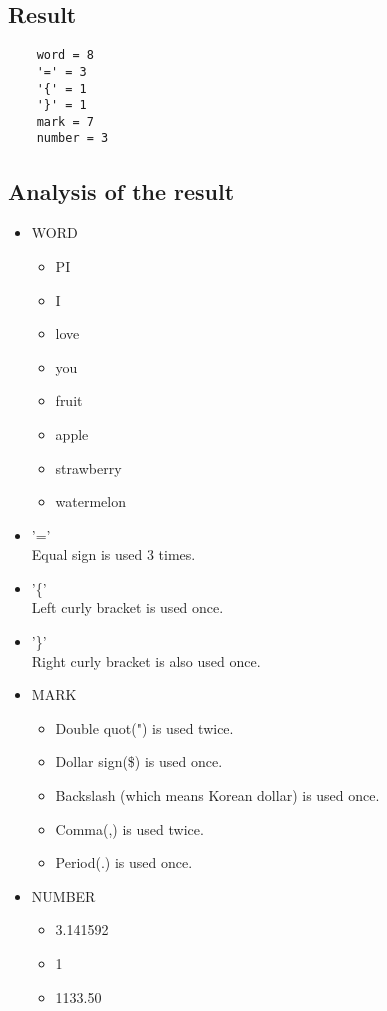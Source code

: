 \documentclass{article}
\begin{document}
\subsection{Result}
\begin{lstlisting}
    word = 8
    '=' = 3
    '{' = 1
    '}' = 1
    mark = 7
    number = 3
\end{lstlisting}

\subsection{Analysis of the result}
\begin{itemize}
    \item WORD
        \begin{itemize}
            \item PI
            \item I
            \item love
            \item you
            \item fruit
            \item apple
            \item strawberry
            \item watermelon
        \end{itemize}
    \item '=' \\
    Equal sign is used 3 times.
    \item '\{' \\
    Left curly bracket is used once.
    \item '\}' \\
    Right curly bracket is also used once.
    \item MARK
        \begin{itemize}
            \item Double quot(") is used twice.
            \item Dollar sign(\$) is used once.
            \item Backslash (which means Korean dollar) is used once.
            \item Comma(,) is used twice.
            \item Period(.) is used once.
        \end{itemize}
    \item NUMBER
        \begin{itemize}
            \item 3.141592
            \item 1
            \item 1133.50
        \end{itemize}
\end{itemize}
\end{document}
